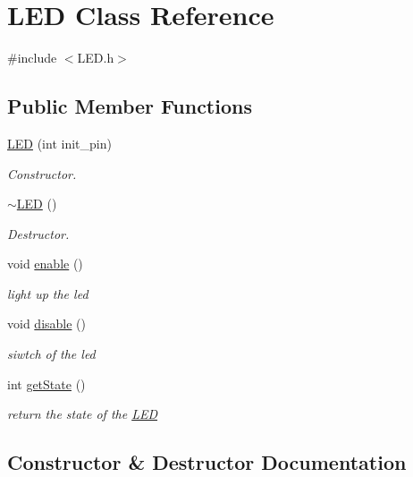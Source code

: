 \hypertarget{class_l_e_d}{}\section{L\+ED Class Reference}
\label{class_l_e_d}


{\ttfamily \#include $<$L\+E\+D.\+h$>$}

\subsection*{Public Member Functions}
\begin{DoxyCompactItemize}
\item 
\hyperlink{class_l_e_d_aaf8598e871f682784e1f20ba772d50a9}{L\+ED} (int init\+\_\+pin)
\begin{DoxyCompactList}\small\item\em Constructor. \end{DoxyCompactList}\item 
\hyperlink{class_l_e_d_a5cb49cf2696615d43952baf8ade06767}{$\sim$\+L\+ED} ()
\begin{DoxyCompactList}\small\item\em Destructor. \end{DoxyCompactList}\item 
void \hyperlink{class_l_e_d_ad49b7b4dd1e4d8ad667da1be9ce7bcf5}{enable} ()
\begin{DoxyCompactList}\small\item\em light up the led \end{DoxyCompactList}\item 
void \hyperlink{class_l_e_d_a96e732b7178a9d961fb3bec0078fc2bc}{disable} ()
\begin{DoxyCompactList}\small\item\em siwtch of the led \end{DoxyCompactList}\item 
int \hyperlink{class_l_e_d_a856e5728756d749bc127e9383f2216a6}{get\+State} ()
\begin{DoxyCompactList}\small\item\em return the state of the \hyperlink{class_l_e_d}{L\+ED} \end{DoxyCompactList}\end{DoxyCompactItemize}


\subsection{Constructor \& Destructor Documentation}
\mbox{\label{class_l_e_d_aaf8598e871f682784e1f20ba772d50a9}} 
